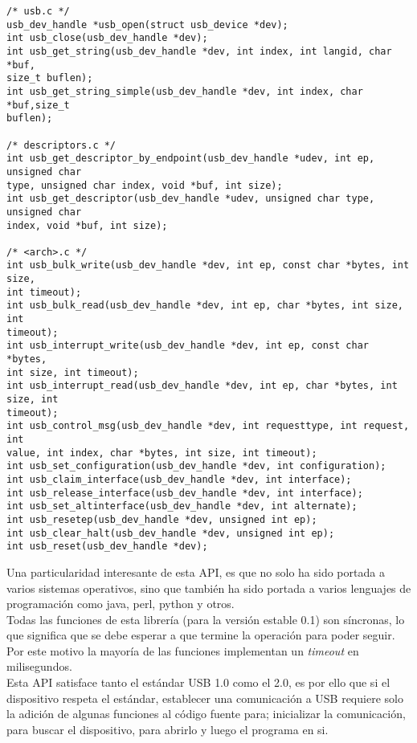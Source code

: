 \begin{lstlisting}
/* usb.c */
usb_dev_handle *usb_open(struct usb_device *dev);
int usb_close(usb_dev_handle *dev);
int usb_get_string(usb_dev_handle *dev, int index, int langid, char *buf,
size_t buflen);
int usb_get_string_simple(usb_dev_handle *dev, int index, char *buf,size_t
buflen);

/* descriptors.c */
int usb_get_descriptor_by_endpoint(usb_dev_handle *udev, int ep, unsigned char
type, unsigned char index, void *buf, int size);
int usb_get_descriptor(usb_dev_handle *udev, unsigned char type, unsigned char
index, void *buf, int size);

/* <arch>.c */
int usb_bulk_write(usb_dev_handle *dev, int ep, const char *bytes, int size,
int timeout);
int usb_bulk_read(usb_dev_handle *dev, int ep, char *bytes, int size, int
timeout);
int usb_interrupt_write(usb_dev_handle *dev, int ep, const char *bytes,
int size, int timeout);
int usb_interrupt_read(usb_dev_handle *dev, int ep, char *bytes, int size, int
timeout);
int usb_control_msg(usb_dev_handle *dev, int requesttype, int request, int
value, int index, char *bytes, int size, int timeout);
int usb_set_configuration(usb_dev_handle *dev, int configuration);
int usb_claim_interface(usb_dev_handle *dev, int interface);
int usb_release_interface(usb_dev_handle *dev, int interface);
int usb_set_altinterface(usb_dev_handle *dev, int alternate);
int usb_resetep(usb_dev_handle *dev, unsigned int ep);
int usb_clear_halt(usb_dev_handle *dev, unsigned int ep);
int usb_reset(usb_dev_handle *dev);
\end{lstlisting}


Una particularidad interesante de esta API, es que no solo ha sido portada a
varios sistemas operativos, sino que tambi\'en ha sido portada a
varios lenguajes de programaci\'on como java, perl, python y otros.\\

Todas las funciones de esta librer\'ia (para la versi\'on estable 0.1) son
s\'incronas, lo que significa que se debe esperar a que termine la operaci\'on
para poder seguir. Por este motivo la mayor\'ia de las funciones implementan un
\emph{timeout} en milisegundos.\\

Esta API satisface tanto el est\'andar USB 1.0 como el 2.0, es por ello que si
el dispositivo respeta el est\'andar, establecer una comunicaci\'on a USB
requiere solo la adici\'on de algunas funciones al c\'odigo fuente para;
inicializar la comunicaci\'on, para buscar el dispositivo, para abrirlo y
luego el programa en si.




